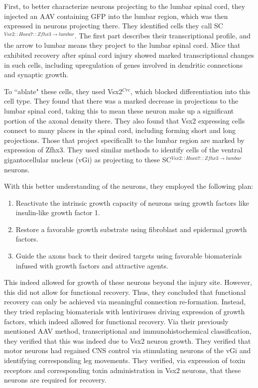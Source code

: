 \documentclass[12pt]{report}
\begin{document}
First, to better characterize neurons projecting to the lumbar spinal cord, they injected an AAV containing GFP into the lumbar region, which was then expressed in neurons projecting there. They identified cells they call SC$^{Vsx2::Hoxa7::Zfhx3\rightarrow lumbar}$. The first part describes their transcriptional profile, and the arrow to lumbar means they project to the lumbar spinal cord. Mice that exhibited recovery after spinal cord injury showed marked transcriptional changes in such cells, including upregulation of genes involved in dendritic connections and synaptic growth.\newline

To ``ablate" these cells, they used Vsx2$^{Cre}$, which blocked differentiation into this cell type. They found that there was a marked decrease in projections to the lumbar spinal cord, taking this to mean these neuron make up a significant portion of the axonal density there. They also found that Vsx2 expressing cells connect to many places in the spinal cord, including forming short and long projections. Those that project specificallt to the lumbar region are marked by expression of Zfhx3. They used similar methods to identify cells of the ventral gigantocellular nucleus (vGi) as projecting to these SC$^{Vsx2::Hoxa7::Zfhx3\rightarrow lumbar}$ neurons.\newline

With this better understanding of the neurons, they employed the following plan: 
\begin{enumerate}
    \itemsep 0em
    \item Reactivate the intrinsic growth capacity of neurons using growth factors like insulin-like growth factor 1. 
    \item Restore a favorable growth substrate using fibroblast and epidermal growth factors. 
    \item Guide the axons back to their desired targets using favorable biomaterials infused with growth factors and attractive agents. 
\end{enumerate}

This indeed allowed for growth of these neurons beyond the injury site. However, this did not allow for functional recovery. Thus, they concluded that functional recovery can only be achieved via meaningful connection re-formation. Instead, they tried replacing biomaterials with lentiviruses driving expression of growth factors, which indeed allowed for functional recovery. Via their previously mentioned AAV method, transcriptional and immunohistochemical classification, they verified that this was indeed due to Vsx2 neuron growth. They verified that motor neurons had regained CNS control via stimulating neurons of the vGi and identifying corresponding leg movements. They verified, via expression of toxin receptors and corresponding toxin administration in Vsx2 neurons, that these neurons are required for recovery. 
\end{document}
